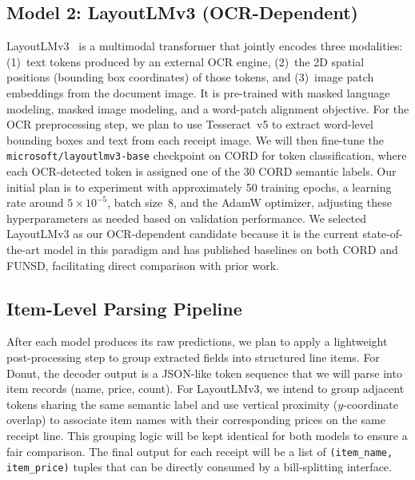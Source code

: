 \documentclass[9pt,twocolumn,twoside]{extarticle}
\begin{document}
\subsection{Model 2: LayoutLMv3 (OCR-Dependent)}
\label{sec:layoutlm}

LayoutLMv3~\cite{huang2022layoutlmv3} is a multimodal transformer that jointly encodes three modalities: (1)~text tokens produced by an external OCR engine, (2)~the 2D spatial positions (bounding box coordinates) of those tokens, and (3)~image patch embeddings from the document image. It is pre-trained with masked language modeling, masked image modeling, and a word-patch alignment objective. For the OCR preprocessing step, we plan to use Tesseract~v5 to extract word-level bounding boxes and text from each receipt image. We will then fine-tune the \texttt{microsoft/layoutlmv3-base} checkpoint on CORD for token classification, where each OCR-detected token is assigned one of the 30 CORD semantic labels. Our initial plan is to experiment with approximately 50 training epochs, a learning rate around $5 \times 10^{-5}$, batch size~8, and the AdamW optimizer, adjusting these hyperparameters as needed based on validation performance. We selected LayoutLMv3 as our OCR-dependent candidate because it is the current state-of-the-art model in this paradigm and has published baselines on both CORD and FUNSD, facilitating direct comparison with prior work.

\subsection{Item-Level Parsing Pipeline}
\label{sec:pipeline}

After each model produces its raw predictions, we plan to apply a lightweight post-processing step to group extracted fields into structured line items. For Donut, the decoder output is a JSON-like token sequence that we will parse into item records (name, price, count). For LayoutLMv3, we intend to group adjacent tokens sharing the same semantic label and use vertical proximity ($y$-coordinate overlap) to associate item names with their corresponding prices on the same receipt line. This grouping logic will be kept identical for both models to ensure a fair comparison. The final output for each receipt will be a list of \texttt{(item\_name, item\_price)} tuples that can be directly consumed by a bill-splitting interface.

\end{document}
